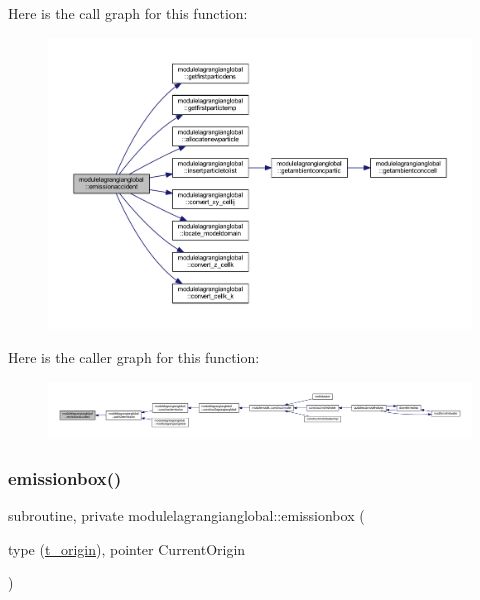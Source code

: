 Here is the call graph for this function\+:\nopagebreak
\begin{figure}[H]
\begin{center}
\leavevmode
\includegraphics[width=350pt]{namespacemodulelagrangianglobal_a8a8675b6cb7d5395b650391ce4ac3fac_cgraph}
\end{center}
\end{figure}
Here is the caller graph for this function\+:\nopagebreak
\begin{figure}[H]
\begin{center}
\leavevmode
\includegraphics[width=350pt]{namespacemodulelagrangianglobal_a8a8675b6cb7d5395b650391ce4ac3fac_icgraph}
\end{center}
\end{figure}
\mbox{\label{namespacemodulelagrangianglobal_ad983b6fdc70e80cc81cd4c13a69b7f1f}} 
\subsubsection{\texorpdfstring{emissionbox()}{emissionbox()}}
{\footnotesize\ttfamily subroutine, private modulelagrangianglobal\+::emissionbox (\begin{DoxyParamCaption}\item[{type (\mbox{\hyperlink{structmodulelagrangianglobal_1_1t__origin}{t\+\_\+origin}}), pointer}]{Current\+Origin }\end{DoxyParamCaption})\hspace{0.3cm}{\ttfamily [private]}}

